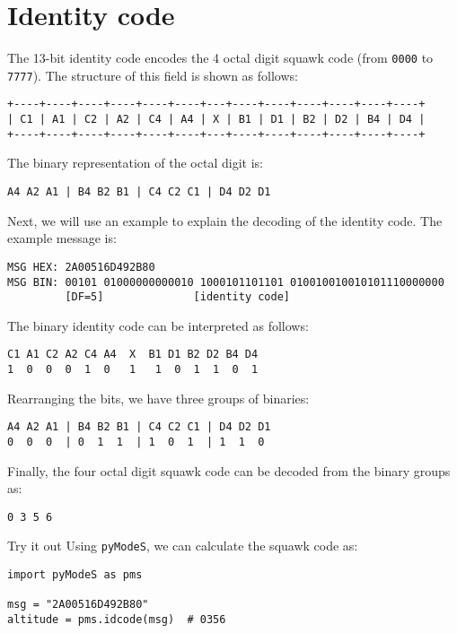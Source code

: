 \section{Identity code} \label{sec:id_code}

The 13-bit identity code encodes the 4 octal digit squawk code (from \texttt{0000} to \texttt{7777}). The structure of this field is shown as follows:

\begin{verbatim}
+----+----+----+----+----+----+---+----+----+----+----+----+----+
| C1 | A1 | C2 | A2 | C4 | A4 | X | B1 | D1 | B2 | D2 | B4 | D4 |
+----+----+----+----+----+----+---+----+----+----+----+----+----+
\end{verbatim}

The binary representation of the octal digit is:

\begin{verbatim}
A4 A2 A1 | B4 B2 B1 | C4 C2 C1 | D4 D2 D1
\end{verbatim}


Next, we will use an example to explain the decoding of the identity code. The example message is:

\begin{verbatim}
MSG HEX: 2A00516D492B80
MSG BIN: 00101 01000000000010 1000101101101 010010010010101110000000
         [DF=5]              [identity code]
\end{verbatim}

The binary identity code can be interpreted as follows:

\begin{verbatim}
C1 A1 C2 A2 C4 A4  X  B1 D1 B2 D2 B4 D4
1  0  0  0  1  0   1   1  0  1  1  0  1
\end{verbatim}

Rearranging the bits, we have three groups of binaries:
\begin{verbatim}
A4 A2 A1 | B4 B2 B1 | C4 C2 C1 | D4 D2 D1
0  0  0  | 0  1  1  | 1  0  1  | 1  1  0
\end{verbatim}

Finally, the four octal digit squawk code can be decoded from the binary groups as:
\begin{verbatim}
0 3 5 6
\end{verbatim}

\begin{notebox}{Try it out}
Using \texttt{pyModeS}, we can calculate the squawk code as: 

\begin{verbatim}
import pyModeS as pms

msg = "2A00516D492B80"
altitude = pms.idcode(msg)  # 0356
\end{verbatim}

\end{notebox}